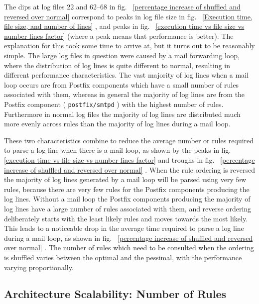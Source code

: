 \documentclass[draft]{svmult}
\newcommand{\refwithpage}[1]{%
    \empty{}\vref{#1}%
}
\newcommand{\daemon}[1]{%
    \texttt{postfix/#1}%
}
\begin{document}
The dips at log files 22 and 62--68 in fig.~\refwithpage{percentage
increase of shuffled and reversed over normal} correspond to peaks in log
file size in fig.~\refwithpage{Execution time, file size, and number of
lines}, and peaks in fig.~\refwithpage{execution time vs file size vs
number lines factor} (where a peak means that performance is better).  The
explanation for this took some time to arrive at, but it turns out to be
reasonably simple.  The large log files in question were caused by a mail
forwarding loop, where the distribution of log lines is quite different to
normal, resulting in different performance characteristics.  The vast
majority of log lines when a mail loop occurs are from Postfix components
which have a small number of rules associated with them, whereas in general
the majority of log lines are from the Postfix component (\daemon{smtpd})
with the highest number of rules.  Furthermore in normal log files the
majority of log lines are distributed much more evenly across rules than
the majority of log lines during a mail loop.

These two characteristics combine to reduce the average number or rules
required to parse a log line when there is a mail loop, as shown by the
peaks in fig.~\refwithpage{execution time vs file size vs number lines
factor} and troughs in fig.~\refwithpage{percentage increase of shuffled
and reversed over normal}.  When the rule ordering is reversed the majority
of log lines generated by a mail loop will be parsed using very few rules,
because there are very few rules for the Postfix components producing the
log lines.  Without a mail loop the Postfix components producing the
majority of log lines have a large number of rules associated with them,
and reverse ordering deliberately starts with the least likely rules and
moves towards the most likely.  This leads to a noticeable drop in the
average time required to parse a log line during a mail loop, as shown in
fig.~\refwithpage{percentage increase of shuffled and reversed over
normal}.  The number of rules which need to be consulted when the ordering
is shuffled varies between the optimal and the pessimal, with the
performance varying proportionally.

\subsection{Architecture Scalability: Number of Rules}
\end{document}
